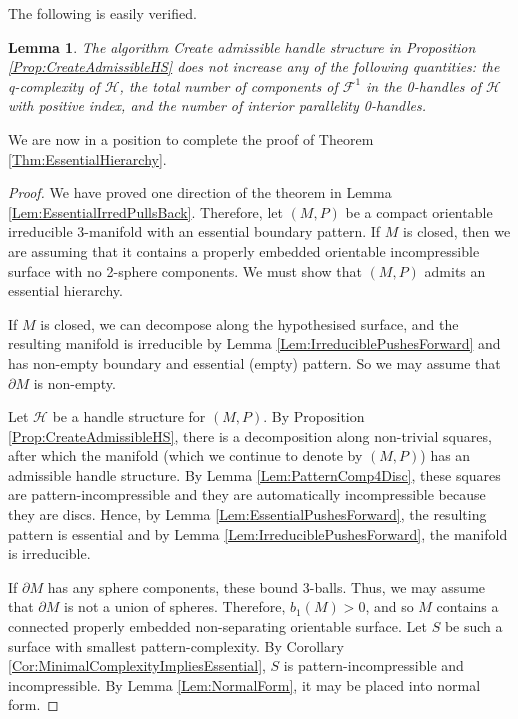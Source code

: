 \documentclass[oneside]{amsart}
\numberwithin{equation}{section}
\theoremstyle{plain}
\newtheorem{lemma}[equation]{Lemma}
\theoremstyle{definition}
\begin{document}
The following is easily verified.

\begin{lemma}
\label{Lem:ComplexitiesDecreaseInAdmissibleAlgorithm}
The algorithm {\sc Create admissible handle structure} in Proposition \ref{Prop:CreateAdmissibleHS} does not increase any of the following quantities: the q-complexity of $\mathcal{H}$,  the total number of components of $\mathcal{F}^1$ in the 0-handles of $\mathcal{H}$ with positive index, and the number of interior parallelity 0-handles.
\end{lemma}

We are now in a position to complete the proof of Theorem \ref{Thm:EssentialHierarchy}. 

\begin{proof} 
We have proved one direction of the theorem in Lemma \ref{Lem:EssentialIrredPullsBack}. Therefore,
let $(M,P)$ be a compact orientable irreducible 3-manifold with an essential boundary pattern. If $M$ is closed, then we are assuming that it contains a properly embedded orientable incompressible surface with no 2-sphere components. We must show that $(M,P)$ admits an essential hierarchy. 

If $M$ is closed, we can decompose along the hypothesised surface, and the resulting manifold is irreducible by Lemma \ref{Lem:IrreduciblePushesForward} and has non-empty boundary and essential (empty) pattern. So we may assume that $\partial M$ is non-empty.

Let $\mathcal{H}$ be a handle structure for $(M,P)$. By Proposition \ref{Prop:CreateAdmissibleHS}, there is a decomposition along non-trivial squares, after which the manifold (which we continue to denote by $(M,P)$) has an admissible handle structure. By Lemma \ref{Lem:PatternComp4Disc}, these squares are pattern-incompressible and they are automatically incompressible because they are discs. Hence, by Lemma \ref{Lem:EssentialPushesForward}, the resulting pattern is essential and by Lemma \ref{Lem:IrreduciblePushesForward}, the manifold is irreducible.

If $\partial M$ has any sphere components, these bound 3-balls. Thus, we may assume that $\partial M$ is not a union of spheres. Therefore, $b_1(M) > 0$, and so $M$ contains a connected properly embedded non-separating orientable surface. Let $S$ be such a surface with smallest pattern-complexity. By Corollary \ref{Cor:MinimalComplexityImpliesEssential}, $S$ is pattern-incompressible and incompressible. By Lemma \ref{Lem:NormalForm}, it may be placed into normal form. 


\end{proof}
\end{document}
